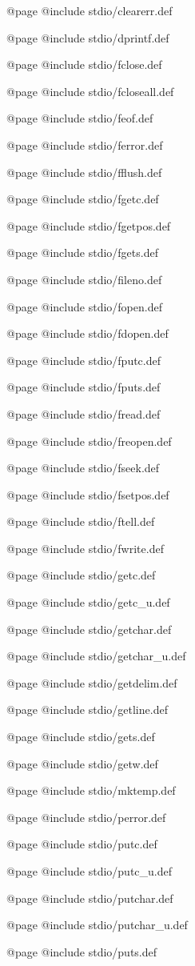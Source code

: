 @page
@include stdio/clearerr.def

@page
@include stdio/dprintf.def

@page
@include stdio/fclose.def

@page
@include stdio/fcloseall.def

@page
@include stdio/feof.def

@page
@include stdio/ferror.def

@page
@include stdio/fflush.def

@page 
@include stdio/fgetc.def 

@page
@include stdio/fgetpos.def

@page 
@include stdio/fgets.def 

@page
@include stdio/fileno.def

@page
@include stdio/fopen.def

@page
@include stdio/fdopen.def

@page
@include stdio/fputc.def

@page
@include stdio/fputs.def

@page
@include stdio/fread.def

@page
@include stdio/freopen.def

@page
@include stdio/fseek.def

@page
@include stdio/fsetpos.def

@page
@include stdio/ftell.def

@page
@include stdio/fwrite.def

@page 
@include stdio/getc.def 

@page
@include stdio/getc_u.def

@page
@include stdio/getchar.def 

@page
@include stdio/getchar_u.def

@page
@include stdio/getdelim.def

@page
@include stdio/getline.def

@page 
@include stdio/gets.def

@page 
@include stdio/getw.def 

@page
@include stdio/mktemp.def

@page
@include stdio/perror.def

@page
@include stdio/putc.def

@page
@include stdio/putc_u.def

@page
@include stdio/putchar.def

@page
@include stdio/putchar_u.def

@page
@include stdio/puts.def

